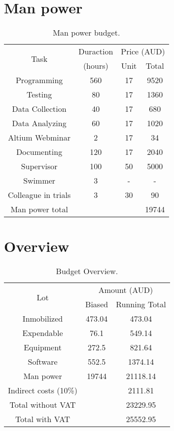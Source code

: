 \section{Man power}
\begin{table}[htbp!]
	\centering
	\begin{tabular}{*4c}
		\toprule
		\multirow{2}{*}{Task} & Duraction & \multicolumn{2}{c}{Price (AUD)} \\
		 &  (hours) & Unit & Total \\
		\midrule
		Programming & 560 & 17 & 9520\\
		Testing & 80 & 17 & 1360 \\
		Data Collection & 40 & 17 & 680\\
		Data Analyzing & 60 & 17 & 1020 \\
		Altium Webminar & 2 & 17 & 34 \\
		Documenting & 120 & 17 & 2040 \\
		Supervisor & 100 & 50 & 5000\\
		Swimmer & 3 & - & - \\
		Colleague in trials & 3 & 30 & 90 \\
		\midrule
		Man power total & & &  19744 \\
		\bottomrule
	\end{tabular}
	\caption{Man power budget.}
	\label{tb:man_power}
\end{table}

\section{Overview}
\begin{table}[htbp!]
	\centering
	\begin{tabular}{*3c}
		\toprule
		\multirow{2}{*}{Lot}  & \multicolumn{2}{c}{Amount (AUD)} \\
		 & Biased & Running Total \\
		\midrule
		Inmobilized & 473.04 & 473.04\\
		Expendable & 76.1 & 549.14 \\
		Equipment & 272.5 & 821.64 \\
		Software & 552.5 & 1374.14 \\
		Man power & 19744 & 21118.14 \\
		\midrule
		Indirect costs (10\%) & &  2111.81 \\
		\midrule
		Total without VAT& &  23229.95 \\
		\midrule
		Total with VAT & &  25552.95 \\
		\bottomrule
	\end{tabular}
	\caption{Budget Overview.}
	\label{tb:overview}
\end{table}